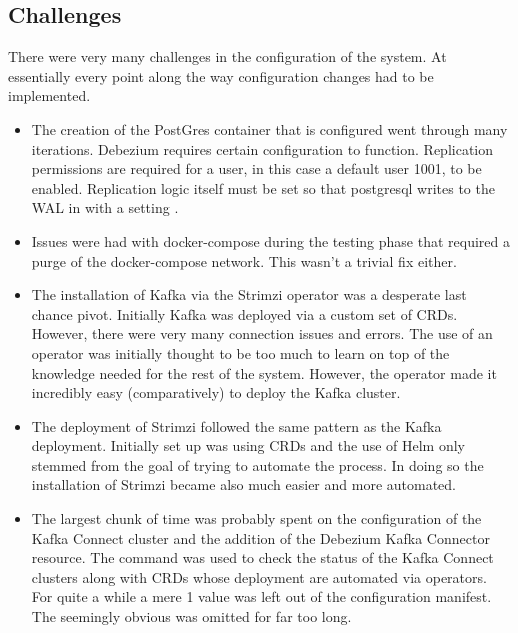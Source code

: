 \begin{flushleft}
    \section{Challenges}
    There were very many challenges in the configuration of the system. At essentially every point along the way configuration changes had to be 
    implemented.
    \begin{itemize}
        \item The creation of the PostGres container that is configured went through many iterations. Debezium requires certain configuration 
        to function. Replication permissions are required for a user, in this case a default user 1001, to be enabled. Replication logic itself
        must be set so that postgresql writes to the WAL in with a  setting \autocite{LogicalDecodingOutput}.
        \item Issues were had with docker-compose during the testing phase that required a purge of the docker-compose network. This wasn't a trivial
        fix either.
        \item The installation of Kafka via the Strimzi operator was a desperate last chance pivot. Initially Kafka was deployed via a custom 
        set of CRDs. However, there were very many connection issues and  errors. The use of an operator was initially 
        thought to be too much to learn on top of the knowledge needed for the rest of the system. \newline However, the operator made it incredibly 
        easy (comparatively) to deploy the Kafka cluster.
        \item The deployment of Strimzi followed the same pattern as the Kafka deployment. Initially set up was using CRDs and the 
        use of Helm only stemmed from the goal of trying to automate the process. In doing so the installation of Strimzi became also much 
        easier and more automated.
        \item The largest chunk of time was probably spent on the configuration of the Kafka Connect cluster and the addition of the 
        Debezium Kafka Connector resource. The  command was used to check the status of the Kafka Connect clusters along 
        with CRDs whose deployment are automated via operators.\newline
        For quite a while a mere 1 value was left out of the configuration manifest. The seemingly obvious 
        was omitted for far too long.
    \end{itemize}
\end{flushleft}